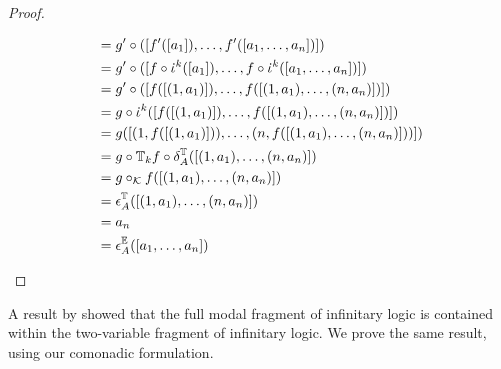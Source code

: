\begin{prop}
\begin{proof}
\begin{enumerate}[label=(\arabic*)]
\begin{align*}
&= g' \circ ([f'([a_{1}]),\dots,f'([a_{1},\dots,a_{n}])]) \\
&= g' \circ ([f \circ \iota^{k}([a_{1}]),\dots,f \circ \iota^{k}([a_{1},\dots,a_{n}])]) \\
&= g' \circ ([f([(1,a_{1})]),\dots,f([(1,a_{1}),\dots,(n,a_{n})])]) \\
&= g \circ \iota^{k} ([f([(1,a_{1})]),\dots,f([(1,a_{1}),\dots,(n,a_{n})])]) \\
&= g ([(1,f([(1,a_{1})])),\dots,(n,f([(1,a_{1}),\dots,(n,a_{n})]))]) \\
&= g \circ \pcomonad{k}{f} \circ \delta^{\pcomonad{}{}}_{A}([(1,a_{1}),\dots,(n,a_{n})]) \\
&= g \circ_{\mathcal{K}} f([(1,a_{1}),\dots,(n,a_{n})]) \\
&= \epsilon^{\pcomonad{}{}}_{A}([(1,a_{1}),\dots,(n,a_{n})]) \\
&= a_{n} \\
&= \epsilon^{\efcomonad{}{}}_{A}([a_{1},\dots,a_{n}]) \\
\end{align*}
\end{enumerate}
\end{proof}
\end{prop}
A result by \cite{Gabbay1981} showed that the full modal fragment of infinitary logic is contained within the two-variable fragment of infinitary logic. We prove the same result, using our comonadic formulation.
